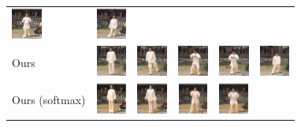 \documentclass{article}
\begin{document}
\begin{table}[t]
\begin{center}
\begin{small}
\begin{sc}
\begin{tabular}{m{1.0cm}m{1.0cm}m{1.0cm}m{1.0cm}m{1.0cm}m{1.0cm}}
\includegraphics[width=1cm, height=1cm]{images/intro_image/animate_5_fomm.png} &
\includegraphics[width=1cm, height=1cm]{images/intro_image/animate_6_fomm.png} \\
Ours & \includegraphics[width=1cm, height=1cm]{images/intro_image/animate_1.png} &
\includegraphics[width=1cm, height=1cm]{images/intro_image/animate_2.png} &
\includegraphics[width=1cm, height=1cm]{images/intro_image/animate_4.png} &
\includegraphics[width=1cm, height=1cm]{images/intro_image/animate_5.png} &
\includegraphics[width=1cm, height=1cm]{images/intro_image/animate_6.png} \\
Ours (softmax)&
\includegraphics[width=1cm, height=1cm]{images/softmax/01.png} &
\includegraphics[width=1cm, height=1cm]{images/softmax/02.png} &
\includegraphics[width=1cm, height=1cm]{images/softmax/04.png} &
\includegraphics[width=1cm, height=1cm]{images/softmax/05.png} &

\end{tabular}
\end{sc}
\end{small}
\end{center}
\end{table}
\end{document}
